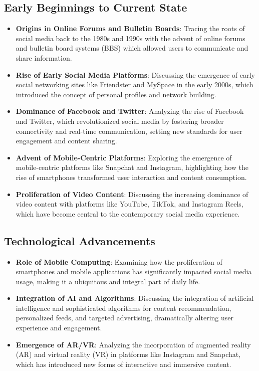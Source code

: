 \documentclass[
]{book}
\providecommand{\tightlist}{%
  \setlength{\itemsep}{0pt}\setlength{\parskip}{0pt}}
\begin{document}
\hypertarget{early-beginnings-to-current-state}{%
\subsection*{Early Beginnings to Current State}\label{early-beginnings-to-current-state}}

\begin{itemize}
\tightlist
\item
  \textbf{Origins in Online Forums and Bulletin Boards}: Tracing the roots of social media back to the 1980s and 1990s with the advent of online forums and bulletin board systems (BBS) which allowed users to communicate and share information.
\item
  \textbf{Rise of Early Social Media Platforms}: Discussing the emergence of early social networking sites like Friendster and MySpace in the early 2000s, which introduced the concept of personal profiles and network building.
\item
  \textbf{Dominance of Facebook and Twitter}: Analyzing the rise of Facebook and Twitter, which revolutionized social media by fostering broader connectivity and real-time communication, setting new standards for user engagement and content sharing.
\item
  \textbf{Advent of Mobile-Centric Platforms}: Exploring the emergence of mobile-centric platforms like Snapchat and Instagram, highlighting how the rise of smartphones transformed user interaction and content consumption.
\item
  \textbf{Proliferation of Video Content}: Discussing the increasing dominance of video content with platforms like YouTube, TikTok, and Instagram Reels, which have become central to the contemporary social media experience.
\end{itemize}

\hypertarget{technological-advancements}{%
\subsection*{Technological Advancements}\label{technological-advancements}}

\begin{itemize}
\tightlist
\item
  \textbf{Role of Mobile Computing}: Examining how the proliferation of smartphones and mobile applications has significantly impacted social media usage, making it a ubiquitous and integral part of daily life.
\item
  \textbf{Integration of AI and Algorithms}: Discussing the integration of artificial intelligence and sophisticated algorithms for content recommendation, personalized feeds, and targeted advertising, dramatically altering user experience and engagement.
\item
  \textbf{Emergence of AR/VR}: Analyzing the incorporation of augmented reality (AR) and virtual reality (VR) in platforms like Instagram and Snapchat, which has introduced new forms of interactive and immersive content.
\end{itemize}
\end{document}
